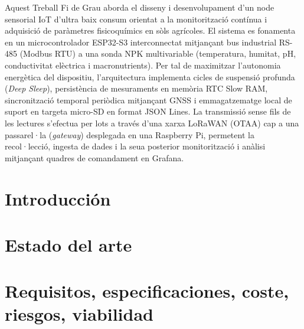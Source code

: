 \documentclass[twoside,spanish,a4paper,12pt]{tfg}
\begin{document}
\begin{resum}
Aquest Treball Fi de Grau aborda el disseny i desenvolupament d'un node sensorial IoT d'ultra baix consum orientat a la monitorització contínua i adquisició de paràmetres fisicoquímics en sòls agrícoles. El sistema es fonamenta en un microcontrolador ESP32-S3 interconnectat mitjançant bus industrial RS-485 (Modbus RTU) a una sonda NPK multivariable (temperatura, humitat, pH, conductivitat elèctrica i macronutrients). Per tal de maximitzar l'autonomia energètica del dispositiu, l'arquitectura implementa cicles de suspensió profunda (\textit{Deep Sleep}), persistència de mesuraments en memòria RTC Slow RAM, sincronització temporal periòdica mitjançant GNSS i emmagatzematge local de suport en targeta micro-SD en format JSON Lines. La transmissió sense fils de les lectures s'efectua per lots a través d'una xarxa LoRaWAN (OTAA) cap a una passarel·la (\textit{gateway}) desplegada en una Raspberry Pi, permetent la recol·lecció, ingesta de dades i la seua posterior monitorització i anàlisi mitjançant quadres de comandament en Grafana.
\end{resum}
\cleardoublepage


\begin{agradecimientos}
\end{agradecimientos}
\cleardoublepage

\tableofcontents

\pagestyle{tfg}
\justify



\chapter{Introducción}


\chapter{Estado del arte}


\chapter{Requisitos, especificaciones, coste, riesgos, viabilidad}

\end{document}
